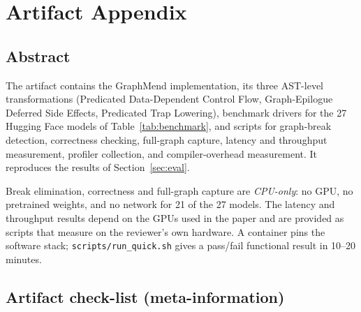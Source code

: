 %
%

\appendix
\section{Artifact Appendix}

\subsection{Abstract}

The artifact contains the GraphMend implementation, its three AST-level
transformations (Predicated Data-Dependent Control Flow, Graph-Epilogue
Deferred Side Effects, Predicated Trap Lowering), benchmark drivers for the 27
Hugging Face models of Table~\ref{tab:benchmark}, and scripts for graph-break
detection, correctness checking, full-graph capture, latency and throughput
measurement, profiler collection, and compiler-overhead measurement. It
reproduces the results of Section~\ref{sec:eval}.

Break elimination, correctness and full-graph capture are \emph{CPU-only}: no
GPU, no pretrained weights, and no network for 21 of the 27 models. The latency
and throughput results depend on the GPUs used in the paper and are provided as
scripts that measure on the reviewer's own hardware. A container pins the
software stack; \texttt{scripts/run\_quick.sh} gives a pass/fail functional
result in 10--20 minutes.

\subsection{Artifact check-list (meta-information)}

